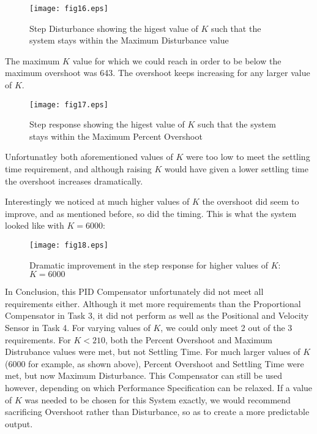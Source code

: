 \documentclass{article}
\newcommand{\matlab}[1]{%
%
}
\begin{document}
\matlab{fig16.m}

\begin{figure}[H]
  \caption{Step Disturbance showing the higest value of $K$ such that the
  system stays within the Maximum Disturbance value}
  \centering
  \texttt{[image: fig16.eps]}
\end{figure}

The maximum $K$ value for which we could reach in order to be below
the maximum overshoot was 643. The overshoot keeps increasing for any larger
value of $K$. 

\matlab{fig17.m}

\begin{figure}[H]
  \caption{Step response showing the higest value of $K$ such that the
  system stays within the Maximum Percent Overshoot}
  \centering
  \texttt{[image: fig17.eps]}
\end{figure}

Unfortunatley both aforementioned values of $K$ were too low to
meet the settling time requirement, and although raising $K$ would have given
a lower settling time the overshoot increases dramatically. 

Interestingly we noticed at much higher values of $K$ the overshoot did seem
to improve, and as mentioned before, so did the timing. This is what the system
looked like with $K = 6000$:

\matlab{fig18.m}

\begin{figure}[H]
  \caption{Dramatic improvement in the step response for higher values of $K$:
  $K = 6000$}
  \centering
  \texttt{[image: fig18.eps]}
\end{figure}

In Conclusion, this PID Compensator unfortunately did not meet all requirements
either. Although it met more requirements than the Proportional Compensator in
Task 3, it did not perform as well as the Positional and Velocity Sensor in
Task 4. For varying values of $K$, we could only meet 2 out of the 3 requirements.
For $K < 210$, both the Percent Overshoot and Maximum Distrubance values were
met, but not Settling Time. For much larger values of $K$ (6000 for example,
as shown above), Percent Overshoot and Settling Time were met, but now Maximum
Disturbance. This Compensator can still be used however, depending on which
Performance Specification can be relaxed. If a value of $K$ was needed to be
chosen for this System exactly, we would recommend sacrificing Overshoot rather
than Disturbance, so as to create a more predictable output.
\end{document}
